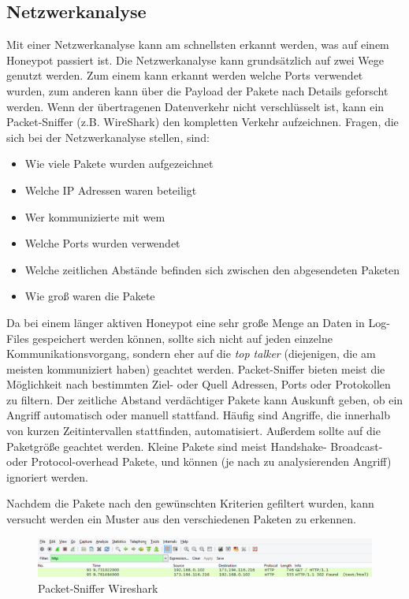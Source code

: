 \subsection{Netzwerkanalyse}
Mit einer Netzwerkanalyse kann am schnellsten erkannt werden, was auf einem Honeypot passiert ist. Die Netzwerkanalyse kann grundsätzlich auf zwei Wege genutzt werden. Zum einem kann erkannt werden welche Ports verwendet wurden, zum anderen kann über die Payload der Pakete nach Details geforscht werden. Wenn der übertragenen Datenverkehr nicht verschlüsselt ist, kann ein Packet-Sniffer (z.B. WireShark) den kompletten Verkehr aufzeichnen. Fragen, die sich bei der Netzwerkanalyse stellen, sind:

\begin{itemize}
\item Wie viele Pakete wurden aufgezeichnet
\item Welche IP Adressen waren beteiligt
\item Wer kommunizierte mit wem
\item Welche Ports wurden verwendet
\item Welche zeitlichen Abstände befinden sich zwischen den abgesendeten Paketen
\item Wie groß waren die Pakete
\end{itemize} 

\noindent Da bei einem länger aktiven Honeypot eine sehr große Menge an Daten in Log-Files gespeichert werden können, sollte sich nicht auf jeden einzelne Kommunikationsvorgang, sondern eher auf die \emph{top talker} (diejenigen, die am meisten kommuniziert haben) geachtet werden. Packet-Sniffer bieten meist die Möglichkeit nach bestimmten Ziel- oder Quell Adressen, Ports oder Protokollen zu filtern. Der zeitliche Abstand verdächtiger Pakete kann Auskunft geben, ob ein Angriff automatisch oder manuell stattfand. Häufig sind Angriffe, die innerhalb von kurzen Zeitintervallen stattfinden, automatisiert. 
Außerdem sollte auf die Paketgröße geachtet werden. Kleine Pakete sind meist Handshake- Broadcast- oder Protocol-overhead Pakete, und können (je nach zu analysierenden Angriff) ignoriert werden. 

Nachdem die Pakete nach den gewünschten Kriterien gefiltert wurden, kann versucht werden ein Muster aus den verschiedenen Paketen zu erkennen.\\

\begin{figure}[h]
    \centering\includegraphics[scale=0.5]{Bilder/Wireshark.png}
  \caption{Packet-Sniffer Wireshark }
  \label{ws}
\end{figure}